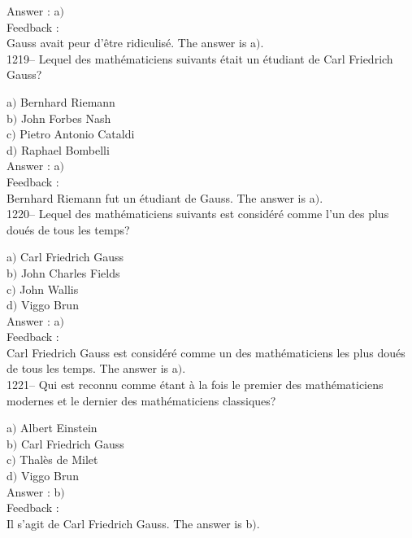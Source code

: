 ﻿\documentclass[letterpaper, 12pt]{article}
\begin{document}
Answer : a$)$\\

Feedback :\\
Gauss avait peur d'\^etre ridiculis\'e.
The answer is a$)$.\\

1219-- Lequel des math\'ematiciens suivants \'etait un \'etudiant de
Carl Friedrich Gauss?

a$)$ Bernhard Riemann \\
b$)$ John Forbes Nash \\
c$)$ Pietro Antonio Cataldi \\
d$)$ Raphael Bombelli\\

Answer : a$)$\\

Feedback : \\
Bernhard Riemann fut un \'etudiant de Gauss.
The answer is a$)$.\\

1220-- Lequel des math\'ematiciens suivants est consid\'er\'e comme
l'un des plus dou\'es de tous les temps?

a$)$ Carl Friedrich Gauss \\
b$)$ John Charles Fields \\
c$)$ John Wallis \\
d$)$ Viggo Brun\\

Answer : a$)$\\

Feedback : \\
Carl Friedrich Gauss est consid\'er\'e comme un des math\'ematiciens
les plus dou\'es de tous les temps.
The answer is a$)$.\\

1221-- Qui est reconnu comme \'etant \`a la fois le premier des
math\'ematiciens modernes et le dernier des math\'ematiciens
classiques?

a$)$ Albert Einstein \\
b$)$ Carl Friedrich Gauss \\
c$)$ Thal\`es de Milet \\
d$)$ Viggo Brun\\

Answer : b$)$\\

Feedback : \\
Il s'agit de Carl Friedrich Gauss.
The answer is b$)$.\\
\end{document}
